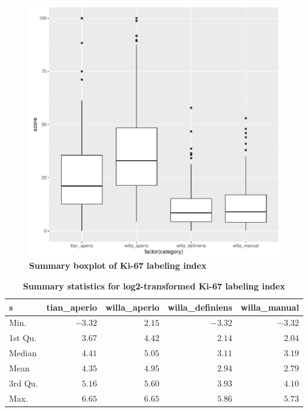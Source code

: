 \documentclass[final,5p,times,twocolumn]{elsarticle}
\begin{document}
\begin{figure}
\includegraphics[width = 11cm]{boxplot}
\centering
\caption{{\bf Summary boxplot of Ki-67 labeling index}}
\label{boxplot}
\end{figure}




\begin{table}[!tbp]
\begin{center}
\begin{tabular}{lrrrr}
\hline\hline
\multicolumn{1}{l}{s}&\multicolumn{1}{c}{tian\_aperio}&\multicolumn{1}{c}{willa\_aperio}&\multicolumn{1}{c}{willa\_definiens}&\multicolumn{1}{c}{willa\_manual}\tabularnewline
\hline
Min.&$-3.32$&$2.15$&$-3.32$&$-3.32$\tabularnewline
1st Qu.&$ 3.67$&$4.42$&$ 2.14$&$ 2.04$\tabularnewline
Median&$ 4.41$&$5.05$&$ 3.11$&$ 3.19$\tabularnewline
Mean&$ 4.35$&$4.95$&$ 2.94$&$ 2.79$\tabularnewline
3rd Qu.&$ 5.16$&$5.60$&$ 3.93$&$ 4.10$\tabularnewline
Max.&$ 6.65$&$6.65$&$ 5.86$&$ 5.73$\tabularnewline
\hline
\end{tabular}\end{center}
\caption{{\bf Summary statistics for log2-transformed Ki-67 labeling index}}
\label{summaryStatistics}

\end{table}
\end{document}
